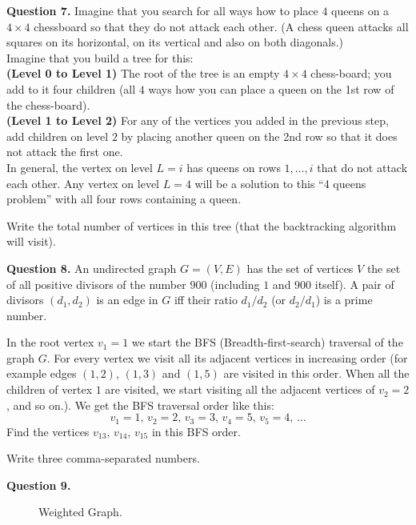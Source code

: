 \documentclass[jou]{apa6}
\begin{document}
\vspace{10pt}
{\bf Question 7.} 
Imagine that you search for all ways how to place $4$ queens on a $4 \times 4$ chessboard so that 
they do not attack each other. (A chess queen attacks all squares on its horizontal, on its vertical
and also on both diagonals.)\\
Imagine that you build a tree for this:\\
{\bf (Level 0 to Level 1)} The root of the tree is an empty $4 \times 4$ chess-board; you add to it four children 
(all $4$ ways how you can place a queen on the 1st row of the chess-board).\\
{\bf (Level 1 to Level 2)} For any of the vertices you added in the previous step, add children on level $2$ by placing 
another queen on the 2nd row so that it does not attack the first one.\\
In general, the vertex on level $L=i$ has queens on rows $1,\ldots,i$ that do not attack each other. 
Any vertex on level $L=4$ will be a solution to this ``4 queens problem'' with all four rows containing a queen.

Write the total number of vertices in this tree (that the backtracking algorithm will visit).


\vspace{10pt}
{\bf Question 8.} An undirected graph $G = (V,E)$ has the set of vertices $V$ \textendash{} 
the set of all positive divisors of the number $900$ (including $1$ and $900$ itself).
A pair of divisors $(d_1,d_2)$ is an edge in $G$ iff their ratio
$d_1/d_2$ (or $d_2/d_1$) is a prime number.

In the root vertex $v_1=1$ we start the BFS (Breadth-first-search) traversal of the graph $G$. For every vertex 
we visit all its adjacent vertices in increasing order (for example edges $(1,2)$, $(1,3)$ and $(1,5)$ 
are visited in this order. When all the children of vertex $1$ are visited, 
we start visiting all the adjacent vertices of $v_2=2$, and so on.). We get the BFS traversal order like this:
$$v_1=1,\,v_2=2,\,v_3=3,\,v_4=5,\,v_5=4,\,\ldots$$
Find the vertices $v_{13},\,v_{14},\,v_{15}$ in this BFS order.

Write three comma-separated numbers.

\vspace{10pt}
{\bf Question 9.}

\begin{figure}[!htb]
\caption{\label{fig:prim-algorithm} Weighted Graph.}
\end{figure}
\end{document}
